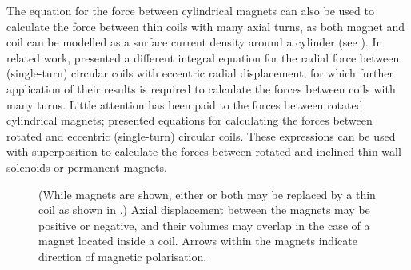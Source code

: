 \documentclass[11pt,a4paper]{memoir}
\begin{document}
The equation for the force between cylindrical magnets can also be used to calculate the force between thin coils with many axial turns, as both magnet and coil can be modelled as a surface current density around a cylinder (see ). In related work, \textcite{kim1996-ietm} presented a different integral equation for the radial force between (single-turn) circular coils with eccentric radial displacement, for which further application of their results is required to calculate the forces between coils with many turns.
Little attention has been paid to the forces between rotated cylindrical magnets; \textcite{babic2011-ietm-incl-coil} presented equations for calculating the forces between rotated and eccentric (single-turn) circular coils.
These expressions can be used with superposition to calculate the forces between rotated and inclined thin-wall solenoids or permanent magnets.

\begin{figure}
\centering
{}
{
  (While magnets are shown, either or both may be replaced by a thin coil as shown in .)
  Axial displacement between the magnets may be positive or negative, and their volumes may overlap in the case of a magnet located inside a coil.
  Arrows within the magnets indicate direction of magnetic polarisation.
}
\end{figure}
\end{document}
